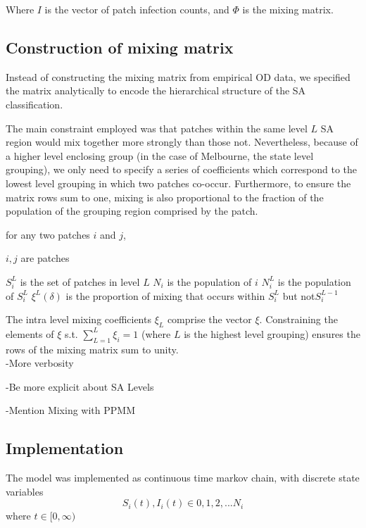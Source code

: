 \documentclass{monashthesis}
\begin{document}
Where \(I\) is the vector of patch infection counts, and \(\Phi\) is the
mixing matrix.

\hypertarget{construction-of-mixing-matrix}{%
\subsection{Construction of mixing
matrix}\label{construction-of-mixing-matrix}}

Instead of constructing the mixing matrix from empirical OD data, we
specified the matrix analytically to encode the hierarchical structure
of the SA classification.

The main constraint employed was that patches within the same level
\(L\) SA region would mix together more strongly than those not.
Nevertheless, because of a higher level enclosing group (in the case of
Melbourne, the state level grouping), we only need to specify a series
of coefficients which correspond to the lowest level grouping in which
two patches co-occur. Furthermore, to ensure the matrix rows sum to one,
mixing is also proportional to the fraction of the population of the
grouping region comprised by the patch.

for any two patches \(i\) and \(j\),

\(i, j\) are patches

\(S_{i}^{L}\) is the set of patches in level \(L\) \(N_i\) is the
population of \(i\) \(N_{i}^{L}\) is the population of \(S_{i}^{L}\)
\(\xi^{L}(\delta)\) is the proportion of mixing that occurs within
\(S_{i}^{L}\) but not\(S_{i}^{L-1}\)

The intra level mixing coefficients \(\xi_L\) comprise the vector
\(\xi\). Constraining the elements of \(\xi\) s.t.
\(\sum\limits_{L = 1}^{L} \xi_i = 1\) (where \(L\) is the highest level
grouping) ensures the rows of the mixing matrix sum to unity.\\

-More verbosity

-Be more explicit about SA Levels

-Mention Mixing with PPMM

\hypertarget{implementation}{%
\subsection{Implementation}\label{implementation}}

The model was implemented as continuous time markov chain, with discrete
state variables \[S_{i}(t), I_{i}(t) \in {0,1,2,...N_{i}}\] where
\(t\in [0, \infty)\)
\end{document}
